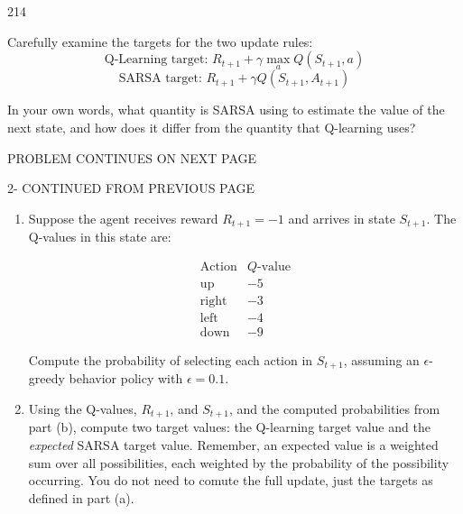 \documentclass[11pt]{article}
\begin{document}
\begin{problem}{2}{14}
\begin{enumerate}[label=(\alph*)]
Carefully examine the targets for the two update rules:
\[
\text{Q-Learning target: } R_{t+1} + \gamma \max_a Q(S_{t+1}, a)
\]
\[
\text{SARSA target: } R_{t+1} + \gamma Q(S_{t+1}, A_{t+1})
\]

In your own words, what quantity is SARSA using to estimate the value of the next state, and how does it differ from the quantity that Q-learning uses?

PROBLEM CONTINUES ON NEXT PAGE
\end{enumerate}
\end{problem}

\begin{problem}{2}{-}
CONTINUED FROM PREVIOUS PAGE
\begin{enumerate}

\item[(b)] Suppose the agent receives reward $R_{t+1} = -1$ and arrives in state $S_{t+1}$. The Q-values in this state are:

\[
\begin{array}{c|c}
\text{Action} & Q\text{-value} \\
\hline
\text{up} & -5 \\
\text{right} & -3 \\
\text{left} & -4 \\
\text{down} & -9
\end{array}
\]

Compute the probability of selecting each action in $S_{t+1}$, assuming an $\epsilon$-greedy behavior policy with $\epsilon = 0.1$.

\item[(c)] Using the Q-values, $R_{t+1}$, and $S_{t+1}$, and the computed probabilities from part (b), compute two target values: the Q-learning target value and the \textit{expected} SARSA target value. Remember, an expected value is a weighted sum over all possibilities, each weighted by the probability of the possibility occurring. You do not need to comute the full update, just the targets as defined in part (a).

\end{enumerate}
\end{problem}

\begin{studentanswer}[30]
\end{studentanswer}



\newpage
\end{document}
